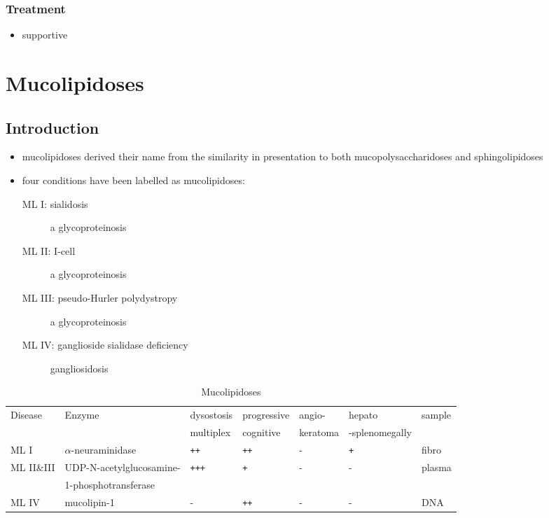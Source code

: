 \documentclass[12pt]{scrartcl}
\begin{document}
\subsubsection{Treatment}
\label{sec:orga996abc}
\begin{itemize}
\item supportive
\end{itemize}
\section{Mucolipidoses}
\label{sec:org3055d02}
\subsection{Introduction}
\label{sec:org3053032}
\begin{itemize}
\item mucolipidoses derived their name from the similarity in
presentation to both mucopolysaccharidoses and sphingolipidoses
\item four conditions have been labelled as mucolipidoses:
\begin{description}
\item[{ML I: sialidosis}] a glycoproteinosis
\item[{ML II: I-cell}] a glycoproteinosis
\item[{ML III: pseudo-Hurler polydystropy}] a glycoproteinosis
\item[{ML IV: ganglioside sialidase deficiency}] gangliosidosis
\end{description}
\end{itemize}


\begin{table}[htbp]
\caption{\label{tab:orga0a48b1}Mucolipidoses}
\centering
\small
\begin{tabular}{lllllll}
Disease & Enzyme & dysostosis & progressive & angio- & hepato & sample\\
 &  & multiplex & cognitive & keratoma & -splenomegally & \\
\hline
ML I & \(\alpha\)-neuraminidase & \texttt{++} & \texttt{++} & - & \texttt{+} & fibro\\
ML II\&III & UDP-N-acetylglucosamine- & \texttt{+++} & \texttt{+} & - & - & plasma\\
 & 1-phosphotransferase &  &  &  &  & \\
ML IV & mucolipin-1 & - & \texttt{++} & - & - & DNA\\
\end{tabular}
\end{table}
\end{document}
